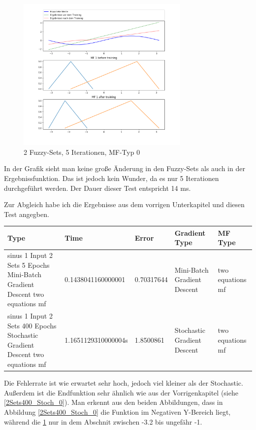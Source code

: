 \begin{figure}[htbp]\label{abb2fs5itmb}
	\centering
	\includegraphics[width=0.75\textwidth]{images/sinus/Mini-Batch/sinus 1 Input 2 Sets 5 Epochs Mini-Batch Gradient Descent two equations mf.png}
	\caption{2 Fuzzy-Sets, 5 Iterationen, MF-Typ 0}
	\label{2mini_batch5:0}
\end{figure}

In der Grafik sieht man keine große Änderung in den Fuzzy-Sets als auch in der Ergebnissfunktion. Das ist jedoch kein Wunder, da es nur 5 Iterationen durchgeführt werden. Der Dauer dieser Test entspricht 14 ms.

Zur Abgleich habe ich die Ergebnisse aus dem vorrigen Unterkapitel und diesen Test
angegben.
\begin{center}\label{tab2_5MB}
	\begin{tabular}{ | p{3cm} | l | l | p{3cm} | p{3cm} |}
		\hline
		Type & Time & Error & Gradient Type & MF Type \\ \hline
		sinus 1 Input 2 Sets 5 Epochs Mini-Batch Gradient Descent two equations mf&0.1438041160000001&0.70317644&Mini-Batch Gradient Descent&two equations mf \\ \hline
		sinus 1 Input 2 Sets 400 Epochs Stochastic Gradient Descent two equations mf&1.1651129310000004s&1.8500861&Stochastic Gradient Descent&two equations mf
		\\ \hline
	\end{tabular}
\end{center}

Die Fehlerrate ist wie erwartet sehr hoch, jedoch viel kleiner als der Stochastic. Außerdem ist die Endfunktion sehr ähnlich wie aus der Vorrigenkapitel (siehe \ref{2Sets400_Stoch_0}). Man erkennt aus den beiden Abbildungen, dass in Abbildung \ref{2Sets400_Stoch_0} die Funktion im Negativen Y-Bereich liegt, während die \ref{2mini_batch5:0} nur in dem Abschnit zwischen -3.2 bis ungefähr -1. 

